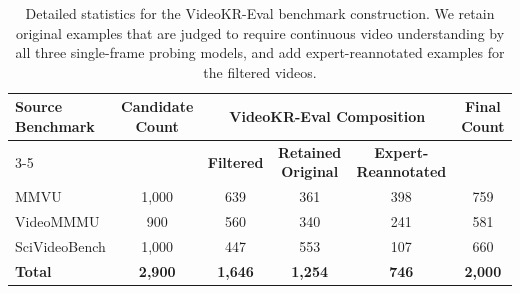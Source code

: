 
\begin{table}[h]
    \centering
    \small
    \caption{Detailed statistics for the VideoKR-Eval benchmark construction. We retain original examples that are judged to require continuous video understanding by all three single-frame probing models, and add expert-reannotated examples for the filtered videos.}
    \label{tab:benchmark-stats}
    \begin{tabular}{lccccc}
        \toprule
        \multirow{2}{*}{\textbf{Source Benchmark}} & \multirow{2}{*}{\textbf{Candidate Count}} & \multicolumn{3}{c}{\textbf{VideoKR-Eval Composition}} & \multirow{2}{*}{\textbf{Final Count}} \\
        \cmidrule(lr){3-5}
         & & \textbf{Filtered} & \textbf{Retained Original} & \textbf{Expert-Reannotated} & \\
        \midrule
        MMVU & 1,000 & 639 & 361 & 398 & 759 \\
        VideoMMMU & 900 & 560 & 340 & 241 & 581 \\
        SciVideoBench & 1,000 & 447 & 553 & 107 & 660 \\
        \midrule
        \textbf{Total} & \textbf{2,900} & \textbf{1,646} & \textbf{1,254} & \textbf{746} & \textbf{2,000} \\
        \bottomrule
    \end{tabular}
\end{table}

